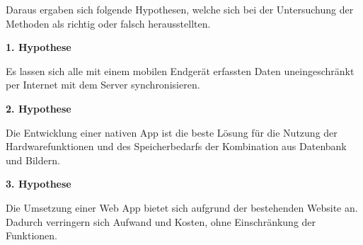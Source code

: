 Daraus ergaben sich folgende Hypothesen, welche sich bei der Untersuchung der Methoden als richtig oder falsch herausstellten.

\textbf {1. Hypothese}

Es lassen sich alle mit einem mobilen Endgerät erfassten Daten uneingeschränkt per Internet mit dem Server synchronisieren.

\textbf {2. Hypothese}

Die Entwicklung einer nativen App ist die beste Lösung für die Nutzung der Hardwarefunktionen und des Speicherbedarfs der Kombination aus Datenbank und Bildern.

\textbf {3. Hypothese}

Die Umsetzung einer Web App bietet sich aufgrund der bestehenden Website an. Dadurch verringern sich Aufwand und Kosten, ohne Einschränkung der Funktionen.